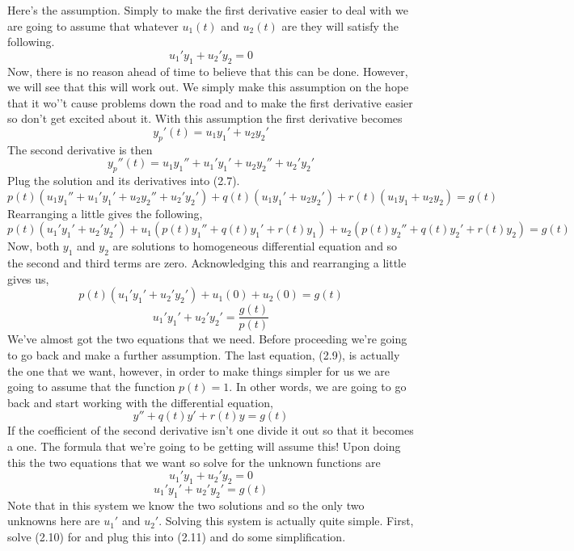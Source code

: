 \documentclass[10pt,reqno]{book}
\theoremstyle{definition}
\begin{document}
	Here's the assumption. Simply to make the first derivative easier to deal with we are going to assume that whatever $ u_1(t) $ and $ u_2(t) $ are they will satisfy the following.
	\begin{equation}
		u_1' y_1 + u_2' y_2 = 0
	\end{equation}
	Now, there is no reason ahead of time to believe that this can be done. However, we will see that this will work out. We simply make this assumption on the hope that it wo'’t cause problems down the road and to make the first derivative easier so don’t get excited about it. With this assumption the first derivative becomes
	\[ y_p'(t) = u_1 y_1' + u_2 y_2' \]
	The second derivative is then
	\[ y_p''(t) = u_1 y_1'' + u_1' y_1' + u_2 y_2'' + u_2' y_2' \]
	Plug the solution and its derivatives into (2.7).
	\[ p(t)(u_1 y_1'' + u_1' y_1' + u_2 y_2'' + u_2' y_2') + q(t)(u_1 y_1' + u_2 y_2') + r(t)(u_1 y_1 + u_2 y_2) = g(t) \]
	Rearranging a little gives the following,
	\[ p(t)(u_1' y_1' + u_2' y_2') + u_1(p(t)y_1'' + q(t)y_1' + r(t)y_1) + u_2(p(t)y_2'' + q(t)y_2' + r(t)y_2) = g(t) \]
	Now, both $ y_1 $ and $ y_2 $ are solutions to homogeneous differential equation and so the second and third terms are zero. Acknowledging this and rearranging a little gives us,
	\[ p(t)(u_1' y_1' + u_2' y_2') + u_1(0) + u_2(0) = g(t) \]
	\begin{equation}
		u_1' y_1' + u_2' y_2' = \frac{g(t)}{p(t)}
	\end{equation}
	We've almost got the two equations that we need. Before proceeding we're going to go back and make a further assumption. The last equation, (2.9), is actually the one that we want, however, in order to make things simpler for us we are going to assume that the function $ p(t) = 1 $. In other words, we are going to go back and start working with the differential equation,
	\[ y'' + q(t)y' + r(t)y = g(t) \]
	If the coefficient of the second derivative isn't one divide it out so that it becomes a one. The formula that we're going to be getting will assume this!  Upon doing this the two equations that we want so solve for the unknown functions are
	\begin{equation}
		u_1' y_1 + u_2' y_2 = 0
	\end{equation}
	\begin{equation}
		u_1' y_1' + u_2' y_2' = g(t)
	\end{equation}
	Note that in this system we know the two solutions and so the only two unknowns here are $ u_1' $ and $ u_2' $. Solving this system is actually quite simple.  First, solve (2.10) for and plug this into (2.11) and do some simplification.
\end{document}
